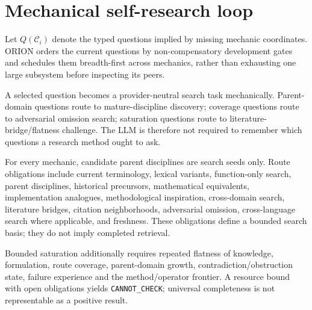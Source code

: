 \section{Mechanical self-research loop}
Let $Q(\mathcal C_i)$ denote the typed questions implied by missing mechanic coordinates.  ORION orders the current questions by non-compensatory development gates and schedules them breadth-first across mechanics, rather than exhausting one large subsystem before inspecting its peers.

A selected question becomes a provider-neutral search task mechanically.  Parent-domain questions route to mature-discipline discovery; coverage questions route to adversarial omission search; saturation questions route to literature-bridge/flatness challenge.  The LLM is therefore not required to remember which questions a research method ought to ask.

For every mechanic, candidate parent disciplines are search seeds only.  Route obligations include current terminology, lexical variants, function-only search, parent disciplines, historical precursors, mathematical equivalents, implementation analogues, methodological inspiration, cross-domain search, literature bridges, citation neighborhoods, adversarial omission, cross-language search where applicable, and freshness.  These obligations define a bounded search basis; they do not imply completed retrieval.

Bounded saturation additionally requires repeated flatness of knowledge, formulation, route coverage, parent-domain growth, contradiction/obstruction state, failure experience and the method/operator frontier.  A resource bound with open obligations yields \texttt{CANNOT\_CHECK}; universal completeness is not representable as a positive result.
